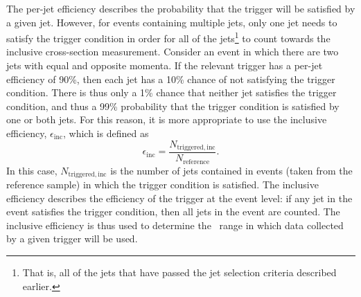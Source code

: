 The per-jet efficiency describes the probability that the trigger will be satisfied by a given jet.
However, for events containing multiple jets, only one jet needs to satisfy the trigger condition in order for all of the jets\footnote{ That is, all of the jets that have passed the jet selection criteria described earlier.} to count towards the inclusive cross-section measurement. Consider an event in which there are two jets with equal and opposite momenta. If the relevant trigger has a per-jet efficiency of 90\%, then each jet has a 10\% chance of not satisfying the trigger condition. There is thus only a 1\% chance that neither jet satisfies the trigger condition, and thus a 99\% probability that the trigger condition is satisfied by one or both jets. For this reason, it is more appropriate to use the inclusive efficiency, $\epsilon_\mathrm{inc}$, which is defined as
\begin{equation}
\epsilon_\mathrm{inc} = \frac{N_\mathrm{triggered,inc}}{N_\mathrm{reference}}.
\end{equation}
In this case, $N_\mathrm{triggered,inc}$ is the number of jets contained in events (taken from the reference sample) in which the trigger condition is satisfied. The inclusive efficiency describes the efficiency of the trigger at the event level: if any jet in the event satisfies the trigger condition, then all jets in the event are counted. The inclusive efficiency is thus used to determine the \pt~range in which data collected by a given trigger will be used. 







%
%






%
%



